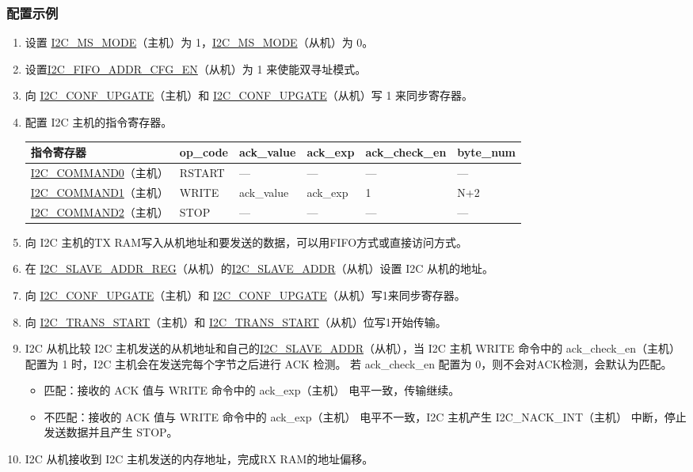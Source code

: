 \documentclass[main\_\_CN.tex]{subfiles}
\begin{document}
\subsubsection{配置示例}
\begin{enumerate}
\item 设置 \hyperref[fielddesc:I2CMSMODE]{I2C\_MS\_MODE}（主机）为 1，\hyperref[fielddesc:I2CMSMODE]{I2C\_MS\_MODE}（从机）为 0。
\item 设置\hyperref[fielddesc:I2CFIFOADDRCFGEN]{I2C\_FIFO\_ADDR\_CFG\_EN}（从机）为 1 来使能双寻址模式。
\item 向 \hyperref[fielddesc:I2CCONFUPGATE]{I2C\_CONF\_UPGATE}（主机）和 \hyperref[fielddesc:I2CCONFUPGATE]{I2C\_CONF\_UPGATE}（从机）写 1 来同步寄存器。
\item 配置 I2C 主机的指令寄存器。
\begin{longtable}{ | p{4cm} | p{2cm} | p{2cm} | p{2cm} |p{2cm} | p{2cm} |}
\hline\rowcolor{lightgray}
指令寄存器& op\_code & ack\_value&ack\_exp&ack\_check\_en&byte\_num  \\ \hline
\hyperref[fielddesc:I2CCOMMAND0]{I2C\_COMMAND0}（主机）& RSTART& ---&---&---&---  \\ \hline
\hyperref[fielddesc:I2CCOMMAND1]{I2C\_COMMAND1}（主机）& WRITE& ack\_value&ack\_exp&1&N+2  \\ \hline
\hyperref[fielddesc:I2CCOMMAND2]{I2C\_COMMAND2}（主机）& STOP& ---&---&---&---  \\ \hline
\end{longtable}
\item 向 I2C 主机的TX RAM写入从机地址和要发送的数据，可以用FIFO方式或直接访问方式。
\item 在 \hyperref[regdesc:I2CSLAVEADDRREG]{I2C\_SLAVE\_ADDR\_REG}（从机）的\hyperref[fielddesc:I2CSLAVEADDR]{I2C\_SLAVE\_ADDR}（从机）设置 I2C 从机的地址。
\item 向 \hyperref[fielddesc:I2CCONFUPGATE]{I2C\_CONF\_UPGATE}（主机）和 \hyperref[fielddesc:I2CCONFUPGATE]{I2C\_CONF\_UPGATE}（从机）写1来同步寄存器。
\item 向 \hyperref[fielddesc:I2CTRANSSTART]{I2C\_TRANS\_START}（主机）和 \hyperref[fielddesc:I2CTRANSSTART]{I2C\_TRANS\_START}（从机）位写1开始传输。
\item I2C 从机比较 I2C 主机发送的从机地址和自己的\hyperref[fielddesc:I2CSLAVEADDR]{I2C\_SLAVE\_ADDR}（从机），当 I2C 主机 WRITE 命令中的 ack\_check\_en（主机） 配置为 1 时，I2C 主机会在发送完每个字节之后进行 ACK 检测。 若 ack\_check\_en 配置为 0，则不会对ACK检测，会默认为匹配。
\begin{itemize}
\item 匹配：接收的 ACK 值与 WRITE 命令中的 ack\_exp（主机） 电平一致，传输继续。
\item 不匹配：接收的 ACK 值与 WRITE 命令中的 ack\_exp（主机） 电平不一致，I2C 主机产生 I2C\_NACK\_INT（主机） 中断，停止发送数据并且产生 STOP。
\end{itemize}
\item I2C 从机接收到 I2C 主机发送的内存地址，完成RX RAM的地址偏移。


\end{enumerate}
\end{document}
